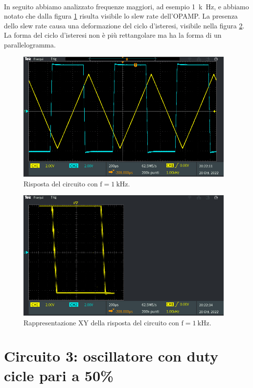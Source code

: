 \documentclass{report}
\begin{document}
\\In seguito abbiamo analizzato frequenze maggiori, ad esempio \SI{1}{k\hertz}, e abbiamo notato che dalla figura \ref{figura:uscita23} risulta visibile lo slew rate dell'OPAMP. La presenza dello slew rate causa una deformazione del ciclo d'isteresi, visibile nella figura \ref{figura:uscita24}. La forma del ciclo d'isteresi non è più rettangolare ma ha la forma di un parallelogramma.
\begin{figure}[h!]
	\centering
	\includegraphics[height=6.5cm]{immagini/TEK00020}
	\caption{Risposta del circuito con $\mathrm{f= \SI{1}{k\hertz}}$.}
	\label{figura:uscita23}
\end{figure}
\begin{figure}[h!]
	\centering
	\includegraphics[height=6.5cm]{immagini/TEK00022}
	\caption{Rappresentazione XY della risposta del circuito con $\mathrm{f= \SI{1}{k\hertz}}$.}
	\label{figura:uscita24}
\end{figure}
\newpage\null\newpage %
\section{Circuito 3: oscillatore con duty cicle pari a 50\%}
\end{document}
